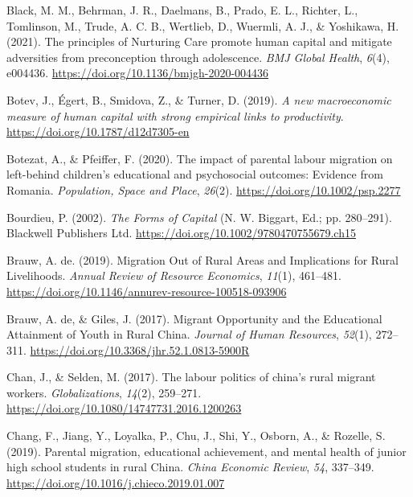 \documentclass[
  man,floatsintext]{apa7}
\newlength{\cslhangindent}
\newlength{\cslentryspacingunit} %
\newenvironment{CSLReferences}[2] %
 {%
  \setlength{\parindent}{0pt}
  \ifodd #1
  \let\oldpar\par
  \def\par{\hangindent=\cslhangindent\oldpar}
  \fi
  \setlength{\parskip}{#2\cslentryspacingunit}
 }%
 {}
\begin{document}
\begin{CSLReferences}{1}{0}
\leavevmode{}%
Black, M. M., Behrman, J. R., Daelmans, B., Prado, E. L., Richter, L., Tomlinson, M., Trude, A. C. B., Wertlieb, D., Wuermli, A. J., \& Yoshikawa, H. (2021). The principles of Nurturing Care promote human capital and mitigate adversities from preconception through adolescence. \emph{BMJ Global Health}, \emph{6}(4), e004436. \url{https://doi.org/10.1136/bmjgh-2020-004436}

\leavevmode{}%
Botev, J., Égert, B., Smidova, Z., \& Turner, D. (2019). \emph{A new macroeconomic measure of human capital with strong empirical links to productivity}. \url{https://doi.org/10.1787/d12d7305-en}

\leavevmode{}%
Botezat, A., \& Pfeiffer, F. (2020). The impact of parental labour migration on left{-}behind children's educational and psychosocial outcomes: Evidence from Romania. \emph{Population, Space and Place}, \emph{26}(2). \url{https://doi.org/10.1002/psp.2277}

\leavevmode{}%
Bourdieu, P. (2002). \emph{The Forms of Capital} (N. W. Biggart, Ed.; pp. 280--291). Blackwell Publishers Ltd. \url{https://doi.org/10.1002/9780470755679.ch15}

\leavevmode{}%
Brauw, A. de. (2019). Migration Out of Rural Areas and Implications for Rural Livelihoods. \emph{Annual Review of Resource Economics}, \emph{11}(1), 461--481. \url{https://doi.org/10.1146/annurev-resource-100518-093906}

\leavevmode{}%
Brauw, A. de, \& Giles, J. (2017). Migrant Opportunity and the Educational Attainment of Youth in Rural China. \emph{Journal of Human Resources}, \emph{52}(1), 272--311. \url{https://doi.org/10.3368/jhr.52.1.0813-5900R}

\leavevmode{}%
Chan, J., \& Selden, M. (2017). The labour politics of china{'}s rural migrant workers. \emph{Globalizations}, \emph{14}(2), 259--271. \url{https://doi.org/10.1080/14747731.2016.1200263}

\leavevmode{}%
Chang, F., Jiang, Y., Loyalka, P., Chu, J., Shi, Y., Osborn, A., \& Rozelle, S. (2019). Parental migration, educational achievement, and mental health of junior high school students in rural China. \emph{China Economic Review}, \emph{54}, 337--349. \url{https://doi.org/10.1016/j.chieco.2019.01.007}


\end{CSLReferences}
\end{document}
